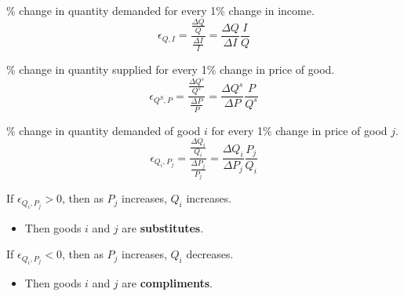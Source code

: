 \documentclass[12pt,t]{beamer}
\begin{document}
\begin{frame}
  
  \bigskip
  \% change in quantity demanded for every 1\% change in income.
  $$
    \epsilon_{Q,I} = \frac{\frac{\Delta Q}{Q}}{\frac{\Delta I}{I}} = \frac{\Delta Q}{\Delta I}\frac{I}{Q}
  $$

  \bigskip
  
  \bigskip
  \% change in quantity supplied for every 1\% change in price of good.
  $$
    \epsilon_{Q^S,P} = \frac{\frac{\Delta Q^s}{Q^s}}{\frac{\Delta P}{P}} = \frac{\Delta Q^s}{\Delta P}\frac{P}{Q^s}
  $$
\end{frame}

\begin{frame}
  
  \bigskip
  \% change in quantity demanded of good $i$ for every 1\% change in price of good $j$.
  $$
    \epsilon_{Q_i,P_j}= \frac{\frac{\Delta Q_i}{Q_i}}{\frac{\Delta P_j}{P_j}}=\frac{\Delta Q_i}{\Delta P_j}\frac{P_j}{Q_i}
  $$
  
  \bigskip
  If $\epsilon_{Q_i,P_j}>0$, then as $P_j$ increases, $Q_i$ increases.
  \begin{itemize}
    \item Then goods $i$ and $j$ are \textbf{substitutes}.
  \end{itemize}
  
  \bigskip
  If $\epsilon_{Q_i,P_j}<0$, then as $P_j$ increases, $Q_i$ decreases.
  \begin{itemize}
    \item Then goods $i$ and $j$ are \textbf{compliments}.
  \end{itemize}
\end{frame}
\end{document}
